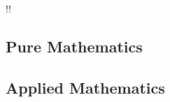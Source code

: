 \documentclass[11pt,a4paper,twoside,twocolumn]{article}
\makeatletter
\renewcommand*{\cleardoublepage}{\clearpage\if@twoside \ifodd\c@page\else
    \hbox{}
    \if!\blankpagetext!\else
    \vfil \begin{center} \setlength{\fboxsep}{3mm}%
    \framebox{\blankpagetext}
    \end{center}\vfil\vfil \fi
    \newpage\if@twocolumn\hbox{}\newpage\fi\fi\fi}
\makeatother
\begin{document}
\cleardoublepage
%
\subsection{Pure Mathematics}
%
%
%
\begin{bibunit}[plain]

\putbib[combined]
\end{bibunit}
%
%
%
\subsection{Applied Mathematics}
\begin{bibunit}[plain]

\putbib[combined]
\end{bibunit}
%
%
%
%
%
%
%
%
%
%
%
%

\renewcommand{\bibsection}{\paragraph{\refname}\par}
\renewcommand{\refname}{Publications}
\setlength{\bibhang}{0pt}

%
%
\end{document}
